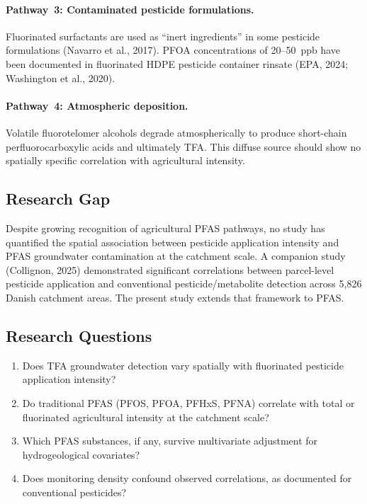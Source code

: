 \documentclass[12pt,a4paper]{article}
\begin{document}
\paragraph{Pathway~3: Contaminated pesticide formulations.} Fluorinated surfactants are used as ``inert ingredients'' in some pesticide formulations (Navarro et al., 2017). PFOA concentrations of 20--50~ppb have been documented in fluorinated HDPE pesticide container rinsate (EPA, 2024; Washington et al., 2020).

\paragraph{Pathway~4: Atmospheric deposition.} Volatile fluorotelomer alcohols degrade atmospherically to produce short-chain perfluorocarboxylic acids and ultimately TFA. This diffuse source should show no spatially specific correlation with agricultural intensity.

\subsection{Research Gap}

Despite growing recognition of agricultural PFAS pathways, no study has quantified the spatial association between pesticide application intensity and PFAS groundwater contamination at the catchment scale. A companion study (Collignon, 2025) demonstrated significant correlations between parcel-level pesticide application and conventional pesticide/metabolite detection across 5,826 Danish catchment areas. The present study extends that framework to PFAS.

\subsection{Research Questions}

\begin{enumerate}
\item Does TFA groundwater detection vary spatially with fluorinated pesticide application intensity?
\item Do traditional PFAS (PFOS, PFOA, PFHxS, PFNA) correlate with total or fluorinated agricultural intensity at the catchment scale?
\item Which PFAS substances, if any, survive multivariate adjustment for hydrogeological covariates?
\item Does monitoring density confound observed correlations, as documented for conventional pesticides?
\end{enumerate}
\end{document}
